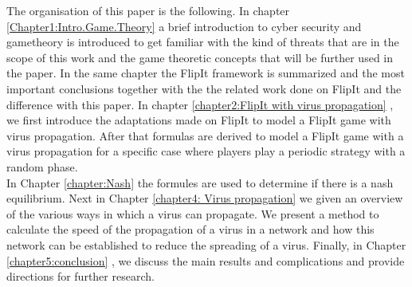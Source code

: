 The organisation of this paper is the following.  In chapter \ref{Chapter1:Intro.Game.Theory}  a brief introduction to cyber security and gametheory is introduced to get familiar with the kind of threats that are in the scope of this work and the game theoretic concepts that will be further used in the paper. In the same chapter the FlipIt framework is summarized and the most important conclusions together with the the related work done on FlipIt and the difference with this paper.
In chapter \ref{chapter2:FlipIt with virus propagation} , we first introduce the adaptations made on FlipIt to model a FlipIt game with virus propagation. After that formulas are derived to model a FlipIt game with a virus propagation for a specific case where players play a periodic strategy with a random phase. \\
In Chapter \ref{chapter:Nash} the formules are used to determine if there is a nash equilibrium. 
Next in Chapter \ref{chapter4: Virus propagation} we given an overview of the various ways in which a virus can propagate. We present a method to calculate the speed of the propagation of a virus in a network and how this network can be established to reduce the spreading of a virus.
Finally, in Chapter \ref{chapter5:conclusion} , we discuss the main results and complications and provide directions for further research.

%
% 
%
%
%
% 
%
%
% 




